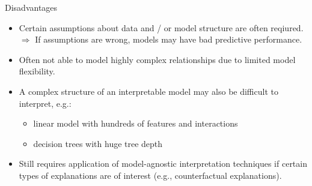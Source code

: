 \documentclass[10pt,compress,t,notes=noshow, xcolor=table]{beamer}
\begin{document}
\begin{frame}{Disadvantages}

    \begin{itemize}
    \itemsep1em
        \item Certain assumptions about data and / or model structure are often reqiured.\\
        $\Rightarrow$ If assumptions are wrong, models may have bad predictive performance.
        \pause
        \item Often not able to model highly complex relationships due to limited model flexibility.
        \pause
        \item A complex structure of an interpretable model may also be difficult to interpret, e.g.:
        \begin{itemize}
            \item linear model with hundreds of features and interactions 
            \item decision trees with huge tree depth
        \end{itemize}
        \pause
        \item Still requires application of model-agnostic interpretation techniques if certain types of explanations are of interest (e.g., counterfactual explanations).
    \end{itemize}

\end{frame}
\end{document}
